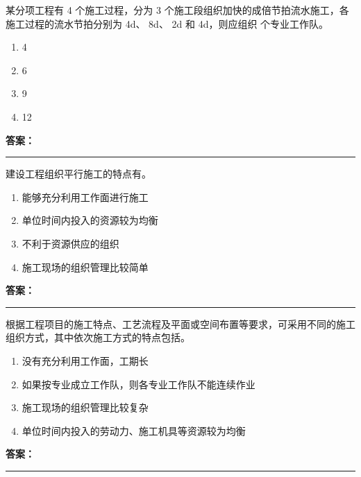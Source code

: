 \documentclass[UTF8,fontset=fandol,11pt]{ctexart}
\newcommand{\answerline}{\textcolor{answerred}{\rule{2.4cm}{0.7pt}}}
\begin{document}
\vspace{0.2em}

\begin{quizbox}[title={第 14 题}]
某分项工程有 4 个施工过程，分为 3 个施工段组织加快的成倍节拍流水施工，各施工过程的流水节拍分别为 4d、 8d、 2d 和 4d，则应组织 个专业工作队。\\
\begin{enumerate}[label=\Alph*.]
\item 4
\item 6
\item 9
\item 12
\end{enumerate}
\textbf{\textcolor{answerred}{答案：}} \answerline
\end{quizbox}

\vspace{0.2em}

\begin{quizbox}[title={第 15 题}]
建设工程组织平行施工的特点有。\\
\begin{enumerate}[label=\Alph*.]
\item 能够充分利用工作面进行施工
\item 单位时间内投入的资源较为均衡
\item 不利于资源供应的组织
\item 施工现场的组织管理比较简单
\end{enumerate}
\textbf{\textcolor{answerred}{答案：}} \answerline
\end{quizbox}

\vspace{0.2em}

\begin{quizbox}[title={第 16 题}]
根据工程项目的施工特点、工艺流程及平面或空间布置等要求，可采用不同的施工组织方式，其中依次施工方式的特点包括。\\
\begin{enumerate}[label=\Alph*.]
\item 没有充分利用工作面，工期长
\item 如果按专业成立工作队，则各专业工作队不能连续作业
\item 施工现场的组织管理比较复杂
\item 单位时间内投入的劳动力、施工机具等资源较为均衡
\end{enumerate}
\textbf{\textcolor{answerred}{答案：}} \answerline
\end{quizbox}

\vspace{0.2em}
\end{document}
